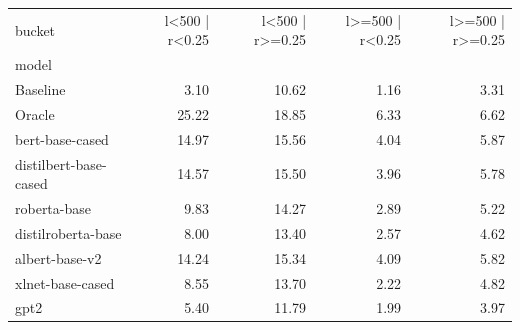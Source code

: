\begin{tabular}{lrrrr}
\toprule
bucket & l<500 | r<0.25 & l<500 | r>=0.25 & l>=500 | r<0.25 & l>=500 | r>=0.25 \\
model &  &  &  &  \\
\midrule
Baseline & 3.10 & 10.62 & 1.16 & 3.31 \\
Oracle & 25.22 & 18.85 & 6.33 & 6.62 \\
bert-base-cased & 14.97 & 15.56 & 4.04 & 5.87 \\
distilbert-base-cased & 14.57 & 15.50 & 3.96 & 5.78 \\
roberta-base & 9.83 & 14.27 & 2.89 & 5.22 \\
distilroberta-base & 8.00 & 13.40 & 2.57 & 4.62 \\
albert-base-v2 & 14.24 & 15.34 & 4.09 & 5.82 \\
xlnet-base-cased & 8.55 & 13.70 & 2.22 & 4.82 \\
gpt2 & 5.40 & 11.79 & 1.99 & 3.97 \\
\bottomrule
\end{tabular}
